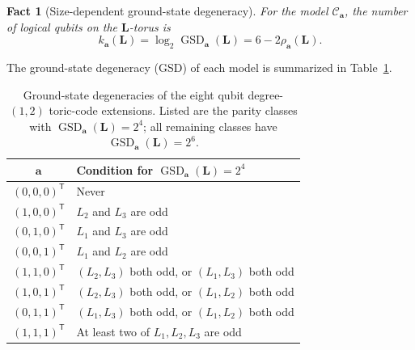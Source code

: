 \documentclass[aps,prx,english,superscriptaddress,twocolumn,tightenlines,showpacs,longbibliography,floatfix,amsfonts]{revtex4-2}
\newtheorem{fact}{Fact}
\theoremstyle{remark}
\theoremstyle{definition}
\begin{document}
\begin{fact}[Size-dependent ground-state degeneracy]
	\label{prop:GSD-eight-E}
	For the model \(\mathcal C_{\mathbf a}\), the number of logical qubits on
	the \(\mathbf L\)-torus is
	\begin{equation}
		\label{eq:GSD-E-formula}
		k_{\mathbf a}(\mathbf L)
		=\log_2\operatorname{GSD}_{\mathbf a}(\mathbf L)
		=6-2\rho_{\mathbf a}(\mathbf L).
	\end{equation}
\end{fact}

The ground-state degeneracy (GSD) of each model is summarized in
Table~\ref{tab:parity-resolved-gsd}.

\begin{table}[t]
	\centering
	\small
	\renewcommand{\arraystretch}{1.15}
	\begin{tabular}{@{}c@{\qquad}p{}@{}}
		\toprule
		\(\mathbf a\) & Condition for
		\(\operatorname{GSD}_{\mathbf a}(\mathbf L)=2^4\) \\
		\midrule
		\((0,0,0)^{\mathsf T}\) & Never \\
		\((1,0,0)^{\mathsf T}\) & \(L_2\) and \(L_3\) are odd \\
		\((0,1,0)^{\mathsf T}\) & \(L_1\) and \(L_3\) are odd \\
		\((0,0,1)^{\mathsf T}\) & \(L_1\) and \(L_2\) are odd \\
		\((1,1,0)^{\mathsf T}\) & \((L_2,L_3)\) both odd, or \((L_1,L_3)\) both odd \\
		\((1,0,1)^{\mathsf T}\) & \((L_2,L_3)\) both odd, or \((L_1,L_2)\) both odd \\
		\((0,1,1)^{\mathsf T}\) & \((L_1,L_3)\) both odd, or \((L_1,L_2)\) both odd \\
		\((1,1,1)^{\mathsf T}\) & At least two of \(L_1,L_2,L_3\) are odd \\
		\bottomrule
	\end{tabular}
	\caption{Ground-state degeneracies of the eight qubit degree-\((1,2)\)
		toric-code extensions.  Listed are the parity classes with
		\(\operatorname{GSD}_{\mathbf a}(\mathbf L)=2^4\); all remaining classes
		have \(\operatorname{GSD}_{\mathbf a}(\mathbf L)=2^6\).}
	\label{tab:parity-resolved-gsd}
\end{table}
\end{document}
